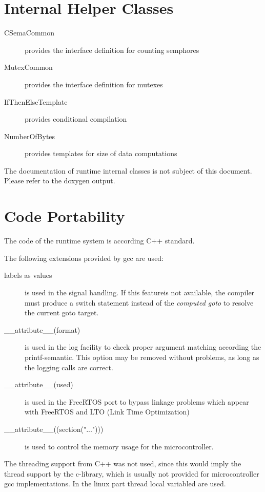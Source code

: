 	\section{Internal Helper Classes}
	\begin{description}
	\item[CSemaCommon]  provides the interface definition for counting semphores
	\item[MutexCommon] provides the interface definition for mutexes
	\item[IfThenElseTemplate] provides conditional compilation
	\item[NumberOfBytes] provides templates for size of data computations
	\end{description}
	The documentation of runtime internal classes is not subject of this document.
	Please refer to the doxygen output.

	\section{Code Portability}
	The code of the runtime system is according C++ standard.

	The following extensions provided by gcc are used:
	\begin{description}
	\item[labels as values] is used in the signal handling. 
	   If this featureis not available, the compiler must produce a switch 
	   statement instead of the {\em computed goto} to resolve
	   the current goto target.
	\item[\_\_attribute\_\_(format)] is used in the log facility to check
	   proper argument matching according the printf-semantic.
	   This option may be removed without problems, as long as the logging
	   calls are correct.
	\item[\_\_attribute\_\_(used)] is used in the FreeRTOS port to bypass linkage
	   problems which appear with FreeRTOS and LTO (Link Time Optimization)
	\item[\_\_attribute\_\_((section("...")))] is used to control the
	   memory usage for the microcontroller.
	\end{description}
	  
        The threading support from C++ was not used, since this would
        imply the thread support by the c-library, which is usually not 
        provided for microcontroller gcc implementations. In the linux part
        thread local variabled are used.
